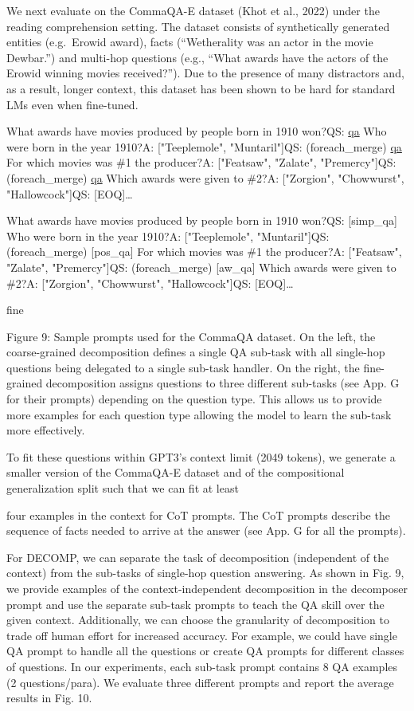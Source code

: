 \documentclass[
]{article}
\begin{document}
We next evaluate on the CommaQA-E dataset (Khot et al., 2022) under the
reading comprehension setting. The dataset consists of synthetically
generated entities (e.g.~Erowid award), facts (``Wetherality was an
actor in the movie Dewbar.'') and multi-hop questions (e.g., ``What
awards have the actors of the Erowid winning movies received?''). Due to
the presence of many distractors and, as a result, longer context, this
dataset has been shown to be hard for standard LMs even when fine-tuned.

What awards have movies produced by people born in 1910 won?QS:
\hyperref[qa]{qa} Who were born in the year 1910?A: {[}"Teeplemole",
"Muntaril"{]}QS: (foreach\_merge) \hyperref[qa]{qa} For which movies was
\#1 the producer?A: {[}"Featsaw", "Zalate", "Premercy"{]}QS:
(foreach\_merge) \hyperref[qa]{qa} Which awards were given to \#2?A:
{[}"Zorgion", "Chowwurst", "Hallowcock"{]}QS: {[}EOQ{]}\ldots{}

What awards have movies produced by people born in 1910 won?QS:
{[}simp\_qa{]} Who were born in the year 1910?A: {[}"Teeplemole",
"Muntaril"{]}QS: (foreach\_merge) {[}pos\_qa{]} For which movies was \#1
the producer?A: {[}"Featsaw", "Zalate", "Premercy"{]}QS:
(foreach\_merge) {[}aw\_qa{]} Which awards were given to \#2?A:
{[}"Zorgion", "Chowwurst", "Hallowcock"{]}QS: {[}EOQ{]}\ldots{}

fine

Figure 9: Sample prompts used for the CommaQA dataset. On the left, the
coarse-grained decomposition defines a single QA sub-task with all
single-hop questions being delegated to a single sub-task handler. On
the right, the fine-grained decomposition assigns questions to three
different sub-tasks (see App. G for their prompts) depending on the
question type. This allows us to provide more examples for each question
type allowing the model to learn the sub-task more effectively.

To fit these questions within GPT3's context limit (2049 tokens), we
generate a smaller version of the CommaQA-E dataset and of the
compositional generalization split such that we can fit at least

four examples in the context for CoT prompts. The CoT prompts describe
the sequence of facts needed to arrive at the answer (see App. G for all
the prompts).

For DECOMP, we can separate the task of decomposition (independent of
the context) from the sub-tasks of single-hop question answering. As
shown in Fig. 9, we provide examples of the context-independent
decomposition in the decomposer prompt and use the separate sub-task
prompts to teach the QA skill over the given context. Additionally, we
can choose the granularity of decomposition to trade off human effort
for increased accuracy. For example, we could have single QA prompt to
handle all the questions or create QA prompts for different classes of
questions. In our experiments, each sub-task prompt contains 8 QA
examples (2 questions/para). We evaluate three different prompts and
report the average results in Fig. 10.
\end{document}
